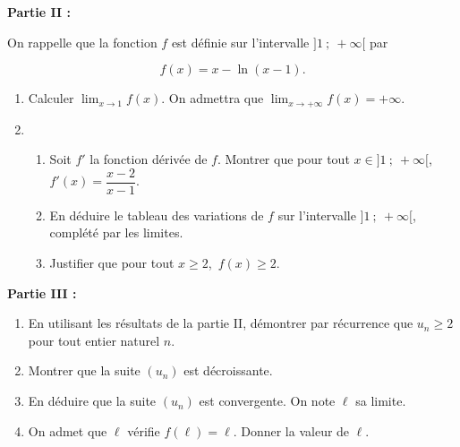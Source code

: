 \bigskip

\textbf{Partie II :}

\medskip

On rappelle que la fonction $f$ est définie sur l'intervalle $]1~;~ +\infty[$ par 

\[f(x) = x - \ln (x - 1).\]

\medskip

\begin{enumerate}
\item Calculer $\displaystyle\lim_{x \to 1} f(x)$. On admettra que $\displaystyle\lim_{x \to + \infty} f(x) = + \infty$.
\item  
	\begin{enumerate}
		\item Soit $f'$ la fonction dérivée de $f$. Montrer que pour tout $x \in ]1~;~ +\infty[$,\,  $f'(x) = \dfrac{x - 2}{x - 1}$.
		\item En déduire le tableau des variations de $f$ sur l'intervalle $]1~;~ +\infty[$, complété par les limites.
		\item Justifier que pour tout $x
\geqslant  2$,\,  $f(x) \geqslant  2$.
	\end{enumerate}
\end{enumerate}

\bigskip

\textbf{Partie III :}

\medskip

\begin{enumerate}
\item En utilisant les résultats de la partie II, démontrer par récurrence que $u_n \geqslant  2$ pour tout entier naturel $n$.
\item Montrer que la suite $\left(u_n\right)$ est décroissante.
\item En déduire que la suite $\left(u_n\right)$ est convergente. On note $\ell$ sa limite.
\item On admet que $\ell$ vérifie $f(\ell) = \ell$. Donner la valeur de $\ell$.
\end{enumerate}
